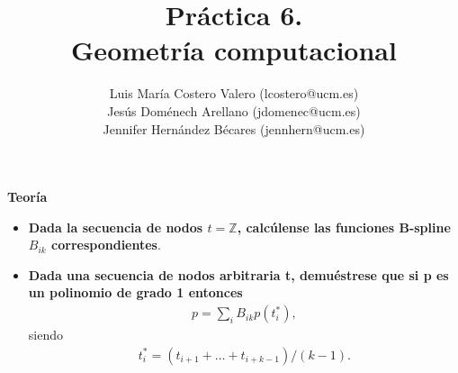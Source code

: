 \documentclass[12pt,a4paper]{article}
\title{Práctica 6. \\ Geometría computacional}
\author{Luis María Costero Valero (lcostero@ucm.es)\\ Jesús Doménech
  Arellano (jdomenec@ucm.es) \\ Jennifer Hernández Bécares (jennhern@ucm.es)}
\date{}
\begin{document}
\maketitle
\onehalfspace

\begin{center}
  {\large \textbf{Teoría}}
\end{center}
\begin{itemize}
\item \textbf{Dada la secuencia de nodos $t=\mathbb{Z}$, calcúlense las
  funciones B-spline $B_{ik}$ correspondientes}.
\item \textbf{Dada una secuencia de nodos arbitraria t, demuéstrese
  que si p es un polinomio de grado 1 entonces}
  \begin{align*}
    p = \sum_{i}B_{ik}p(t_{i}^{*}),
  \end{align*}
  siendo
  \begin{align*}
    t_{i}^{*}=(t_{i+1}+...+t_{i+k-1})/(k-1).
  \end{align*}
\end{itemize} 
\end{document}
